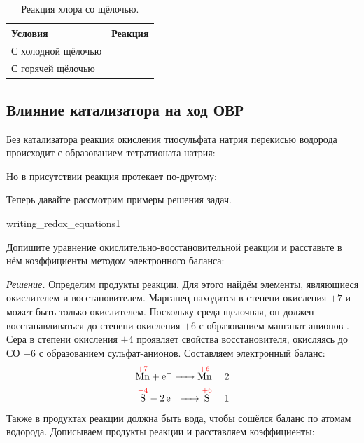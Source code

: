 \begin{table}[htbp]
    \small
    \caption{Реакция хлора со щёлочью.}
    \label{tab:reaction_of_chlorine_with_alkali}
    \begin{tabularx}{\textwidth}{
        >{\hsize}Y
        >{\hsize}Y
        }
        \hline
        Условия & Реакция \\
        \hline
        С холодной щёлочью &   \\
        С горячей щёлочью &  \\
        \hline
    \end{tabularx}
\end{table}

\subsection*{Влияние катализатора на ход ОВР}

Без катализатора реакция окисления тиосульфата натрия перекисью водорода происходит с образованием тетратионата натрия:


Но в присутствии  реакция протекает по-другому:


Теперь давайте рассмотрим примеры решения задач.

\begin{example}{}{writing_redox_equations1}
    \begin{condition}
        Допишите уравнение окислительно-восстановительной реакции и расставьте в нём коэффициенты методом электронного баланса:
    \end{condition}

    \medskip

    \textit{Решение.} Определим продукты реакции. Для этого найдём элементы, являющиеся окислителем и восстановителем. Марганец находится в степени окисления $+7$ и может быть только окислителем. Поскольку среда щелочная, он должен восстанавливаться до степени окисления $+6$ с образованием манганат-анионов . Сера в степени окисления $+4$ проявляет свойства восстановителя, окисляясь до СО $+6$ с образованием сульфат-анионов. Составляем электронный баланс:
    \begin{align*}
        \overset{\textcolor{red}{+7}}{\ce{Mn}} + \ce{e- ->} \overset{\textcolor{red}{+6}}{\ce{Mn}} \quad &| 2 \\
        \overset{\textcolor{red}{+4}}{\ce{S}} - \ce{2e- ->} \overset{\textcolor{red}{+6}}{\ce{S}} \quad &| 1
    \end{align*}
    Также в продуктах реакции должна быть вода, чтобы сошёлся баланс по атомам водорода. Дописываем продукты реакции и расставляем коэффициенты:
\end{example}

